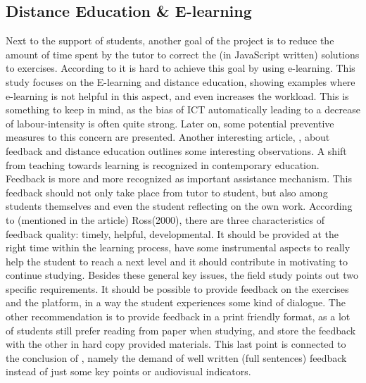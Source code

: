 \documentclass{article}
\begin{document}
\subsection{Distance Education \& E-learning}

Next to the support of students, another goal of the project is to reduce the 
amount of time spent by the tutor to correct the (in JavaScript written) 
solutions to exercises. According to
\citep{guri2005distance}
it is hard to achieve this goal by using 
e-learning. This study focuses on the E-learning and distance education, 
showing
examples where e-learning is not helpful in this aspect, and even 
increases the workload. This is something to keep in mind, as the bias of 
ICT automatically leading to a decrease of labour-intensity is often quite strong.
Later on, some potential preventive measures to this concern
are presented. \newline Another interesting article, 
\citep{ypsilandis2002feedback}
, about feedback and distance education 
outlines some interesting observations. A shift from teaching towards learning
is recognized in contemporary education. Feedback is more and more 
recognized as important assistance mechanism. This feedback should not only
take place from tutor to student, but also among students themselves and even
the student reflecting on the own work. According to (mentioned in the
article) Ross(2000), there are three characteristics of feedback quality:
timely, helpful, developmental. It
should be provided at the right time within the learning process, have some 
instrumental aspects to really help the student to reach a next level and it 
should contribute in motivating to continue studying. Besides these general 
key issues, the field study points out two specific requirements. It should be
possible to provide feedback on the exercises and the platform, in a way the
student experiences some kind of dialogue. The other
recommendation is to provide feedback in a print friendly format, as a lot of 
students still prefer reading from paper when studying, and store
the feedback with the other
in hard copy provided materials. This last point is connected to the conclusion 
of \citep{shepherdgraduate}, namely the demand of well written
(full sentences) 
feedback instead of just some key points or audiovisual indicators.
\end{document}
